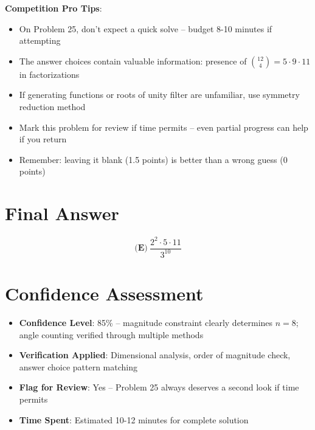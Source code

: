 \documentclass[]{article}
\begin{document}
\begin{tipbox}
\textbf{Competition Pro Tips}:
\begin{itemize}
    \item On Problem 25, don't expect a quick solve -- budget 8-10 minutes if attempting
    \item The answer choices contain valuable information: presence of $\binom{12}{4} = 5 \cdot 9 \cdot 11$ in factorizations
    \item If generating functions or roots of unity filter are unfamiliar, use symmetry reduction method
    \item Mark this problem for review if time permits -- even partial progress can help if you return
    \item Remember: leaving it blank (1.5 points) is better than a wrong guess (0 points)
\end{itemize}
\end{tipbox}

\section*{Final Answer}
\[\boxed{\textbf{(E)}\ \frac{2^2\cdot 5\cdot 11}{3^{10}}}\]

\section*{Confidence Assessment}
\begin{itemize}[leftmargin=*]
    \item \textbf{Confidence Level}: 85\% -- magnitude constraint clearly determines $n=8$; angle counting verified through multiple methods
    \item \textbf{Verification Applied}: Dimensional analysis, order of magnitude check, answer choice pattern matching
    \item \textbf{Flag for Review}: Yes -- Problem 25 always deserves a second look if time permits
    \item \textbf{Time Spent}: Estimated 10-12 minutes for complete solution
\end{itemize}
\end{document}
